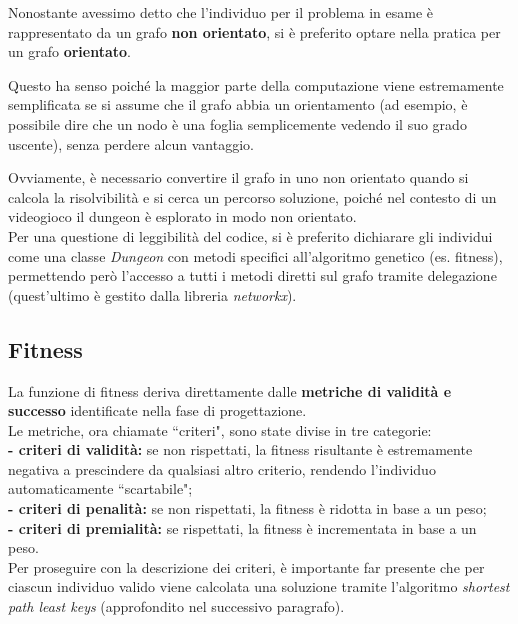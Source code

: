 \documentclass[12pt,titlepage]{article}
\begin{document}
Nonostante avessimo detto che l'individuo per il problema in esame è rappresentato da un grafo \textbf{non orientato}, si è preferito optare nella pratica per un grafo \textbf{orientato}.

Questo ha senso poiché la maggior parte della computazione viene estremamente semplificata se si assume che il grafo abbia un orientamento (ad esempio, è possibile dire che un nodo è una foglia semplicemente vedendo il suo grado uscente), senza perdere alcun vantaggio.

Ovviamente, è necessario convertire il grafo in uno non orientato quando si calcola la risolvibilità e si cerca un percorso soluzione, poiché nel contesto di un videogioco il dungeon è esplorato in modo non orientato. \\

\noindent Per una questione di leggibilità del codice, si è preferito dichiarare gli individui come una classe \textit{Dungeon} con metodi specifici all'algoritmo genetico (es. fitness), permettendo però l'accesso a tutti i metodi diretti sul grafo tramite delegazione (quest'ultimo è gestito dalla libreria \textit{networkx}).

\subsection {Fitness}

La funzione di fitness deriva direttamente dalle \textbf{metriche di validità e successo} identificate nella fase di progettazione.\\

\noindent Le metriche, ora chiamate ``criteri", sono state divise in tre categorie:\\
\textbf{- criteri di validità:} se non rispettati, la fitness risultante è estremamente negativa a prescindere da qualsiasi altro criterio, rendendo l'individuo automaticamente ``scartabile";\\
\textbf{- criteri di penalità:} se non rispettati, la fitness è ridotta in base a un peso;\\
\textbf{- criteri di premialità:} se rispettati, la fitness è incrementata in base a un peso.\\

\noindent Per proseguire con la descrizione dei criteri, è importante far presente che per ciascun individuo valido viene calcolata una soluzione tramite l'algoritmo \textit{shortest path least keys} (approfondito nel successivo paragrafo).
\end{document}

